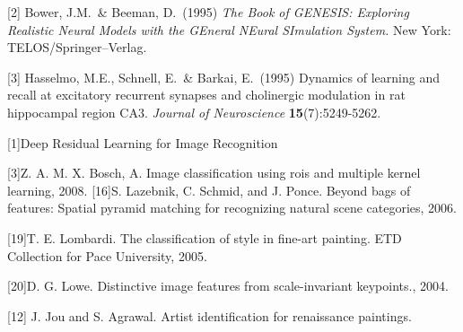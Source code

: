 \documentclass{article}
\begin{document}
[2] Bower, J.M.\ \& Beeman, D.\ (1995) {\it The Book of GENESIS:
  Exploring Realistic Neural Models with the GEneral NEural SImulation
  System.}  New York: TELOS/Springer--Verlag.

[3] Hasselmo, M.E., Schnell, E.\ \& Barkai, E.\ (1995) Dynamics of
learning and recall at excitatory recurrent synapses and cholinergic
modulation in rat hippocampal region CA3. {\it Journal of
  Neuroscience} {\bf 15}(7):5249-5262.
  
[1]Deep Residual Learning for Image Recognition
  
[3]Z. A. M. X. Bosch, A. Image classification using rois and multiple kernel learning, 2008. [16]S. Lazebnik, C. Schmid, and J. Ponce. Beyond bags of features: Spatial pyramid matching for recognizing natural scene categories, 2006.
 
[19]T. E. Lombardi. The classification of style in fine-art painting. ETD Collection for Pace University, 2005. 

[20]D. G. Lowe. Distinctive image features from scale-invariant keypoints., 2004. 

[12] J. Jou and S. Agrawal. Artist identification for renaissance paintings.
  
\end{document}
